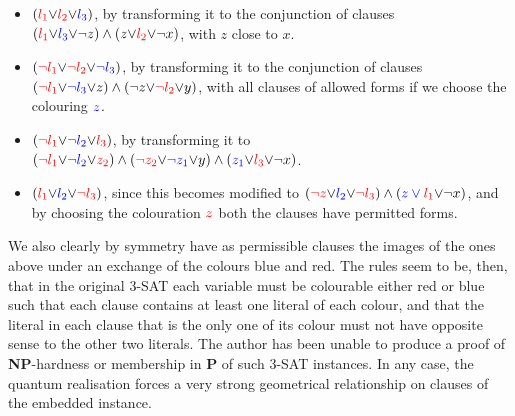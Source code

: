 \documentclass[reprint]{revtex4-1}
\theoremstyle{definition}
\begin{document}
\begin{itemize}
\item $(\color{red}{ l_1} \color{black}{\vee} \color{red}{l_2} \color{black}{\vee} \color{blue}{l_3}\color{black} )$, by transforming it to the conjunction of clauses $(\color{red}{l_1}  \color{black}{\vee} \color{blue}{l_3}\color{black}{\vee} \color{black}{\neg z})\wedge(\color{black}{z}\color{black}{\vee} \color{red}{l_2}\color{black}{\vee} \neg x)$, with $z$ close to $x$.

\item $(\color{red}{\neg l_1} \color{black}{\vee} \color{red}{\neg l_2} \color{black}{\vee} \color{blue}{\neg l_3}\color{black} )$, by transforming it to the conjunction of clauses $(\color{red}{\neg l_1}  \color{black}{\vee} \color{blue}{\neg l_3}\color{black}{\vee} \color{black}{z})\wedge(\color{black}{\neg z}\color{black}{\vee} \color{red}{\neg l_2}\color{black}{\vee} y)$, with all clauses of allowed forms if we choose the colouring $\color{blue}{z}$.

\item $(\color{red}{\neg l_1} \color{black}{\vee} \color{blue}{\neg l_2} \color{black}{\vee} \color{red}{l_3} \color{black})$, by transforming it to 
$(\color{red}{\neg l_1}  \color{black}{\vee}\color{blue}{\neg l_2}  \color{black}{\vee} \color{red}{z_2}   \color{black}) \wedge(\color{red}{\neg z_2}  \color{black}{\vee}  \color{blue}{\neg z_1} \color{black}{\vee}y)    \wedge    (\color{blue}{z_1} \color{black}{\vee}\color{red}{ l_3}  \color{black}{\vee} \neg x)$.

\item $(\color{red}{ l_1} \color{black}{\vee} \color{blue}{l_2} \color{black}{\vee} \color{red}{\neg l_3}\color{black} )$, since this becomes modified to 
$(\color{red}{\neg z} \color{black}{\vee} \color{blue}{ l_2} \color{black}{\vee} \color{red}{\neg l_3}\color{black})\wedge(\color{blue}{z} \vee \color{red}{ l_1}\color{black}{\vee} \neg x)$, and by choosing the colouration $\color{red}{z}$ both the clauses have permitted forms.
\end{itemize}
We also clearly by symmetry have as permissible clauses the images of the ones above under an exchange of the colours blue and red. The rules seem to be, then, that in the original \textsc{3-SAT} each variable must be colourable either red or blue such that each clause contains at least one literal of each colour, and that the literal in each clause that is the only one of its colour must not have opposite sense to the other two literals. The author has been unable to produce a proof of \textbf{NP}-hardness or membership in \textbf{P} of such \textsc{3-SAT} instances. In any case, the quantum realisation forces a very strong geometrical relationship on clauses of the embedded instance.
 
\end{document}
